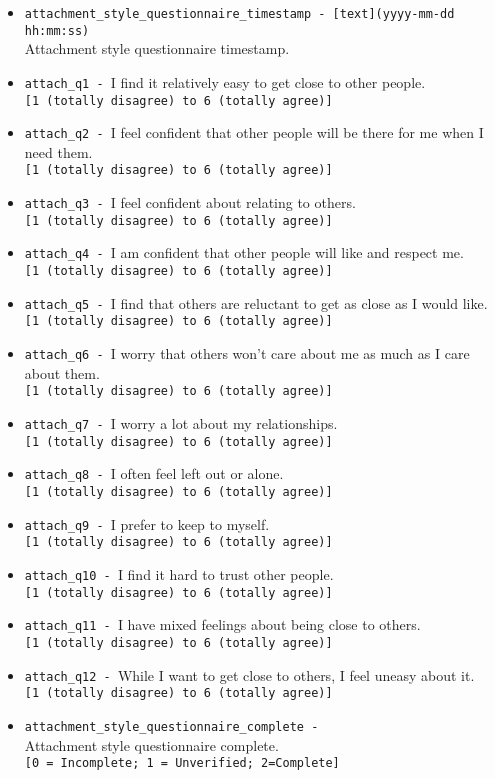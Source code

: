 \begin{description}
\begin{addmargin}[0em]{0em}
\begin{addmargin}[1em]{0em}
\begin{itemize}
            \item \verb|attachment_style_questionnaire_timestamp - [text](yyyy-mm-dd hh:mm:ss)|\\Attachment style questionnaire timestamp.
            \item \verb|attach_q1 - |I find it relatively easy to get close to other people.\\\verb|[1 (totally disagree) to 6 (totally agree)]|
            \item \verb|attach_q2 - |I feel confident that other people will be there for me when I need them.\\\verb|[1 (totally disagree) to 6 (totally agree)]|
            \item \verb|attach_q3 - |I feel confident about relating to others.\\\verb|[1 (totally disagree) to 6 (totally agree)]|
            \item \verb|attach_q4 - |I am confident that other people will like and respect me.\\\verb|[1 (totally disagree) to 6 (totally agree)]|
            \item \verb|attach_q5 - |I find that others are reluctant to get as close as I would like.\\\verb|[1 (totally disagree) to 6 (totally agree)]|
            \item \verb|attach_q6 - |I worry that others won't care about me as much as I care about them.\\\verb|[1 (totally disagree) to 6 (totally agree)]|
            \item \verb|attach_q7 - |I worry a lot about my relationships.\\\verb|[1 (totally disagree) to 6 (totally agree)]|
            \item \verb|attach_q8 - |I often feel left out or alone.\\\verb|[1 (totally disagree) to 6 (totally agree)]|
            \item \verb|attach_q9 - |I prefer to keep to myself.\\\verb|[1 (totally disagree) to 6 (totally agree)]|
            \item \verb|attach_q10 - |I find it hard to trust other people.\\\verb|[1 (totally disagree) to 6 (totally agree)]|
            \item \verb|attach_q11 - |I have mixed feelings about being close to others.\\\verb|[1 (totally disagree) to 6 (totally agree)]|
            \item \verb|attach_q12 - |While I want to get close to others, I feel uneasy about it.\\\verb|[1 (totally disagree) to 6 (totally agree)]|
            \item \verb|attachment_style_questionnaire_complete - |\\Attachment style questionnaire complete.\\\verb|[0 = Incomplete; 1 = Unverified; 2=Complete]|\\


\end{itemize}
\end{addmargin}
\end{addmargin}
\end{description}
